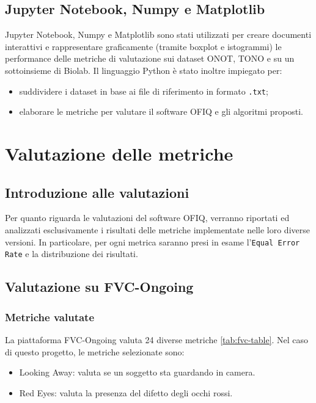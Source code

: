 \documentclass[12pt,a4paper,openright,twoside]{book}
\begin{document}
\section{Jupyter Notebook, Numpy e Matplotlib}
Jupyter Notebook, Numpy e Matplotlib sono stati utilizzati per creare documenti interattivi e rappresentare graficamente (tramite boxplot e istogrammi) le performance delle metriche di valutazione sui dataset ONOT, TONO e su un sottoinsieme di Biolab.
Il linguaggio Python è stato inoltre impiegato per:
\begin{itemize}
    \item suddividere i dataset in base ai file di riferimento in formato \texttt{.txt};
    \item elaborare le metriche per valutare il software OFIQ e gli algoritmi proposti.
\end{itemize}

\chapter{Valutazione delle metriche}

\section{Introduzione alle valutazioni}
Per quanto riguarda le valutazioni del software OFIQ, verranno riportati ed analizzati esclusivamente i risultati delle metriche implementate nelle loro diverse versioni. 
In particolare, per ogni metrica saranno presi in esame l'\texttt{Equal Error Rate} e la distribuzione dei risultati.

\section{Valutazione su FVC-Ongoing}

\subsection{Metriche valutate}
La piattaforma FVC-Ongoing valuta 24 diverse metriche \cref{tab:fvc-table}.
Nel caso di questo progetto, le metriche selezionate sono:
\begin{itemize}
    \item Looking Away: valuta se un soggetto sta guardando in camera.
    \item Red Eyes: valuta la presenza del difetto degli occhi rossi.
\end{itemize}
\end{document}
